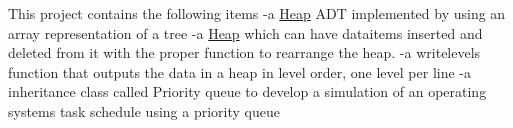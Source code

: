 This project contains the following items -\/a \hyperlink{class_heap}{Heap} A\+DT implemented by using an array representation of a tree -\/a \hyperlink{class_heap}{Heap} which can have dataitems inserted and deleted from it with the proper function to rearrange the heap. -\/a writelevels function that outputs the data in a heap in level order, one level per line -\/a inheritance class called Priority queue to develop a simulation of an operating system\textquotesingle{}s task schedule using a priority queue 